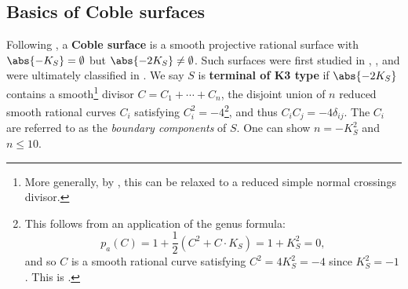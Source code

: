 \documentclass[../../main.tex]{subfiles}
\begin{document}
\subsection{Basics of Coble surfaces}

\begin{remark}
Following \cite[\S 5.1]{DM19}, a \textbf{Coble surface} is a smooth projective rational surface with $\abs{-K_S} = \emptyset$ but $\abs{-2K_S} \neq \emptyset$. Such surfaces were first studied in \cite{Cob19}, \cite{Cob29}, and were ultimately classified in \cite{DZ99}. We say $S$ is \textbf{terminal of K3 type} if $\abs{-2K_S}$ contains a smooth\footnote{More generally, by \cite{DK24}, this can be relaxed to a reduced simple normal crossings divisor.} divisor $C = C_1 + \cdots + C_{n}$, the disjoint union of $n$ reduced smooth rational curves $C_i$ satisfying $C_i^2 = -4$\footnote{This follows from an application of the genus formula: $$p_{a}(C)=1+\frac{1}{2}\left(C^{2}+C \cdot K_{S}\right)=1+K_{S}^{2}=0,$$ and so $C$ is a smooth rational curve satisfying $C^2 = 4K_S^2 = -4$ since $K_S^2 = -1$. This is \cite[\S. 3.1]{CD12}.}, and thus $C_i C_j = -4\delta_{ij}$. The $C_i$ are referred to as the \textit{boundary components} of $S$. One can show $n = -K_S^2$ and $n\leq 10$.
\end{remark}
\end{document}
